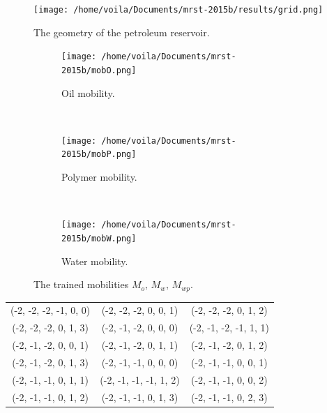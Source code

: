 \begin{figure}[htbp]
    \begin{center}
        \texttt{[image: /home/voila/Documents/mrst-2015b/results/grid.png]}
        \caption{The geometry of the petroleum reservoir.}
        \label{fig: reservoir 3D mesh}
    \end{center}
\end{figure}

\begin{figure}[htbp]\begin{center}
    \begin{subfigure}[t]{.32\textwidth}
        \centering
        \texttt{[image: /home/voila/Documents/mrst-2015b/mobO.png]}
        \caption{Oil mobility.}
        \label{fig: mob O}
    \end{subfigure}\\
    \begin{subfigure}[t]{.32\textwidth}
        \centering
        \texttt{[image: /home/voila/Documents/mrst-2015b/mobP.png]}
        \caption{Polymer mobility.}
        \label{fig: mob P}
    \end{subfigure}\\
    \begin{subfigure}[t]{.32\textwidth}
        \centering
        \texttt{[image: /home/voila/Documents/mrst-2015b/mobW.png]}
        \caption{Water mobility.}
        \label{fig: mob W}
    \end{subfigure}
    \caption{The trained mobilities $M_o,\, M_w,\, M_{wp}$.}
    \label{fig: mobs}
\end{center}\end{figure}

\begin{center}
\begin{tabular}{ccc}
    (-2,  -2,  -2,    -1,     0,     0) & 
    (-2,  -2,  -2,     0,     0,     1) & 
    (-2,  -2,  -2,     0,     1,     2) \\
    (-2,  -2,  -2,     0,     1,     3) &
    (-2,  -1,  -2,     0,     0,     0) &
    (-2,  -1,  -2,    -1,     1,     1) \\
    (-2,  -1,  -2,     0,     0,     1) & 
    (-2,  -1,  -2,     0,     1,     1) &
    (-2,  -1,  -2,     0,     1,     2) \\
    (-2,  -1,  -2,     0,     1,     3) &
    (-2,  -1,  -1,     0,     0,     0) & 
    (-2,  -1,  -1,     0,     0,     1) \\
    (-2,  -1,  -1,     0,     1,     1) &
    (-2,  -1,  -1,    -1,     1,     2) &
    (-2,  -1,  -1,     0,     0,     2) \\
    (-2,  -1,  -1,     0,     1,     2) &
    (-2,  -1,  -1,     0,     1,     3) &
    (-2,  -1,  -1,     0,     2,     3) \\
\end{tabular}
\label{tab: mob O}
\end{center}

